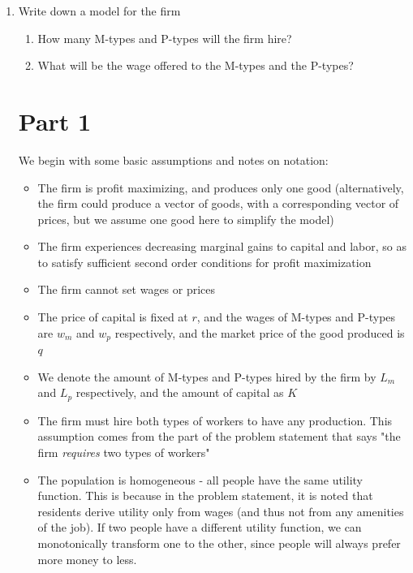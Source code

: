 \documentclass[12pt]{article}
\begin{document}
\begin{enumerate} 

	\item{Write down a model for the firm}
	
\begin{enumerate}

	\item{How many M-types and P-types will the firm hire?}
	\item{What will be the wage offered to the M-types and the P-types?}

\end{enumerate}

\section*{Part 1}

	We begin with some basic assumptions and notes on notation:
	
\begin{itemize}

	\item{The firm is profit maximizing, and produces only one good (alternatively, the firm could produce a vector of goods, with a corresponding vector of prices, but we assume one good here to simplify the model)}
	\item{The firm experiences decreasing marginal gains to capital and labor, so as to satisfy sufficient second order conditions for profit maximization}
	\item{The firm cannot set wages or prices}
	\item{The price of capital is fixed at $r$, and the wages of M-types and P-types are $w_m$ and $w_p$ respectively, and the market price of the good produced is $q$}
	\item{We denote the amount of M-types and P-types hired by the firm by $L_m$ and $L_p$ respectively, and the amount of capital as $K$}
	\item{The firm must hire both types of workers to have any production.  This assumption comes from the part of the problem statement that says "the firm \textit{requires} two types of workers"}
	\item{The population is homogeneous - all people have the same utility function.  This is because in the problem statement, it is noted that residents derive utility only from wages (and thus not from any amenities of the job).  If two people have a different utility function, we can monotonically transform one to the other, since people will always prefer more money to less.}
\end{itemize}


\end{enumerate}
\end{document}
